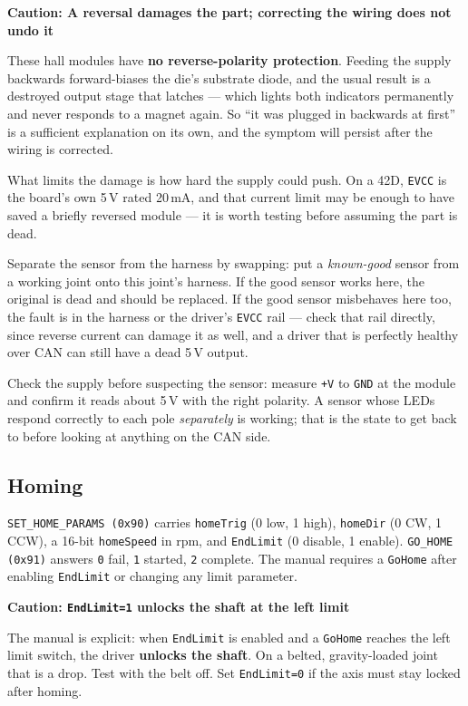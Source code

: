 \documentclass[11pt,letterpaper]{article}
\newenvironment{caution}[1]{%
    \par\addvspace{8pt}%
    \noindent{\color{cautionred}\rule{\linewidth}{0.8pt}}\par\vspace{2pt}
    \noindent\textbf{\color{cautionred}Caution: #1}\par\vspace{2pt}
}{%
    \par\vspace{2pt}\noindent{\color{cautionred}\rule{\linewidth}{0.4pt}}%
    \par\addvspace{8pt}%
}
\begin{document}
\begin{caution}{A reversal damages the part; correcting the wiring does not undo it}
These hall modules have \textbf{no reverse-polarity protection}. Feeding the
supply backwards forward-biases the die's substrate diode, and the usual result
is a destroyed output stage that latches --- which lights both indicators
permanently and never responds to a magnet again. So ``it was plugged in
backwards at first'' is a sufficient explanation on its own, and the symptom
will persist after the wiring is corrected.

What limits the damage is how hard the supply could push. On a 42D,
\texttt{EVCC} is the board's own 5\,V rated 20\,mA, and that current limit may
be enough to have saved a briefly reversed module --- it is worth testing before
assuming the part is dead.

Separate the sensor from the harness by swapping: put a \emph{known-good} sensor
from a working joint onto this joint's harness. If the good sensor works here,
the original is dead and should be replaced. If the good sensor misbehaves here
too, the fault is in the harness or the driver's \texttt{EVCC} rail --- check
that rail directly, since reverse current can damage it as well, and a driver
that is perfectly healthy over CAN can still have a dead 5\,V output.
\end{caution}

Check the supply before suspecting the sensor: measure \texttt{+V} to
\texttt{GND} at the module and confirm it reads about 5\,V with the right
polarity. A sensor whose LEDs respond correctly to each pole \emph{separately} is
working; that is the state to get back to before looking at anything on the CAN
side.

\subsection{Homing}
\texttt{SET\_HOME\_PARAMS (0x90)} carries \texttt{homeTrig} (0 low, 1 high),
\texttt{homeDir} (0 CW, 1 CCW), a 16-bit \texttt{homeSpeed} in rpm, and
\texttt{EndLimit} (0 disable, 1 enable). \texttt{GO\_HOME (0x91)} answers
\texttt{0} fail, \texttt{1} started, \texttt{2} complete. The manual requires a
\texttt{GoHome} after enabling \texttt{EndLimit} or changing any limit parameter.

\begin{caution}{\texttt{EndLimit=1} unlocks the shaft at the left limit}
The manual is explicit: when \texttt{EndLimit} is enabled and a \texttt{GoHome}
reaches the left limit switch, the driver \textbf{unlocks the shaft}. On a belted,
gravity-loaded joint that is a drop. Test with the belt off. Set
\texttt{EndLimit=0} if the axis must stay locked after homing.
\end{caution}
\end{document}
